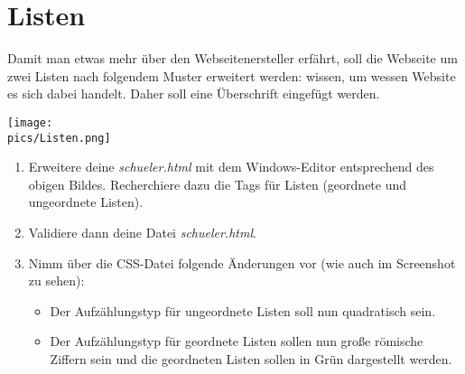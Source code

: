 \section{Listen}
Damit man etwas mehr über den Webseitenersteller erfährt, soll die Webseite um zwei Listen nach folgendem Muster erweitert werden:
wissen, um wessen Website es sich dabei handelt. Daher soll eine Überschrift eingefügt werden.
\begin{minipage}[t]{\textwidth}
    \texttt{[image: \\pics/Listen.png]}
\end{minipage}

\begin{Exercise}[title=, label=Listen]
    \begin{enumerate}
        \item Erweitere deine \textit{schueler.html} mit dem Windows-Editor entsprechend des obigen Bildes. Recherchiere dazu die Tags für Listen (geordnete und ungeordnete Listen).
        \item Validiere dann deine Datei \textit{schueler.html}.
        \item Nimm über die CSS-Datei folgende Änderungen vor (wie auch im Screenshot zu sehen):
        \begin{itemize}
            \item Der Aufzählungstyp für ungeordnete Listen soll nun quadratisch sein.
            \item Der Aufzählungstyp für geordnete Listen sollen nun große römische Ziffern sein und die geordneten Listen sollen in Grün dargestellt werden.
        \end{itemize}
    \end{enumerate}
\end{Exercise}

